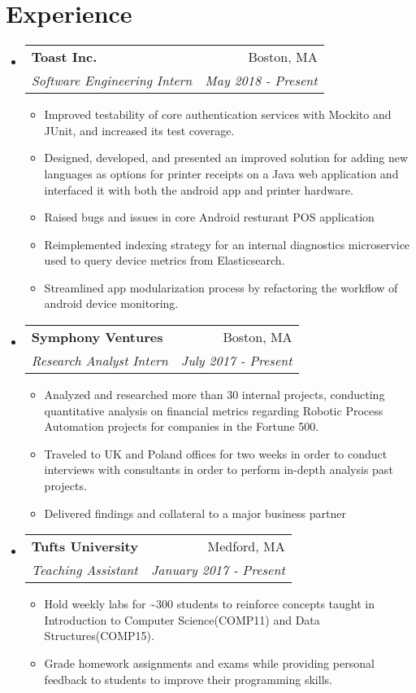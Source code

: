 \documentclass[letterpaper,11pt]{article}
\makeatletter
\newcommand{\resumeItem}[1]{
  \item[{{\textbullet}}]\small{{#1 \vspace{-2pt}}
  }
}
\newcommand{\resumeSubheading}[4]{
  \vspace{-1pt}\item[]
    \begin{tabular*}{0.97\textwidth}{l@{\extracolsep{\fill}}r}
      \textbf{#1} & #2 \\
      \textit{\small#3} & \textit{\small #4} \\
    \end{tabular*}\vspace{-5pt}
}
\newcommand{\resumeSubHeadingListStart}{\begin{itemize}[leftmargin=*]}
\newcommand{\resumeSubHeadingListEnd}{\end{itemize}}
\newcommand{\resumeItemListStart}{\begin{itemize}}
\newcommand{\resumeItemListEnd}{\end{itemize}\vspace{-5pt}}
\makeatother
\begin{document}
\section{Experience}
  \resumeSubHeadingListStart
    \resumeSubheading
      {Toast Inc.}{Boston, MA}
      {Software Engineering Intern}{May 2018 - Present}
      \resumeItemListStart
        \resumeItem
          {Improved testability of core authentication services with Mockito and JUnit, and increased its test coverage.}
        \resumeItem
        {Designed, developed, and presented an improved solution for adding new languages as options for printer receipts on a Java web application and interfaced it with both the android app and printer hardware.}
        \resumeItem 
        {Raised bugs and issues in core Android resturant POS application}
        \resumeItem
          {Reimplemented indexing strategy for an internal diagnostics microservice used to query device metrics from Elasticsearch.}
        \resumeItem
          {Streamlined app modularization process by refactoring the workflow of android device monitoring.}

      \resumeItemListEnd

    \resumeSubheading
      {Symphony Ventures}{Boston, MA}
      {Research Analyst Intern}{July 2017 - Present}
      \resumeItemListStart
        \resumeItem
          {Analyzed and researched more than 30 internal projects, conducting quantitative analysis on financial metrics regarding Robotic Process Automation projects for companies in the Fortune 500.}
        \resumeItem
          {Traveled to UK and Poland offices for two weeks in order to conduct interviews with consultants in order to perform in-depth analysis past projects.}
         \resumeItem
          {
            Delivered findings and collateral to a major business partner 
          }
      \resumeItemListEnd


    \resumeSubheading
      {Tufts University}{Medford, MA}
      {Teaching Assistant}{January 2017 - Present}
      \resumeItemListStart
        \resumeItem
          {Hold weekly labs for \textasciitilde300 students to reinforce concepts taught in Introduction to Computer Science(COMP11) and Data Structures(COMP15).}
        \resumeItem
          {Grade homework assignments and exams while providing personal feedback to students to improve their programming skills.}
          
      \resumeItemListEnd


  \resumeSubHeadingListEnd
\end{document}
